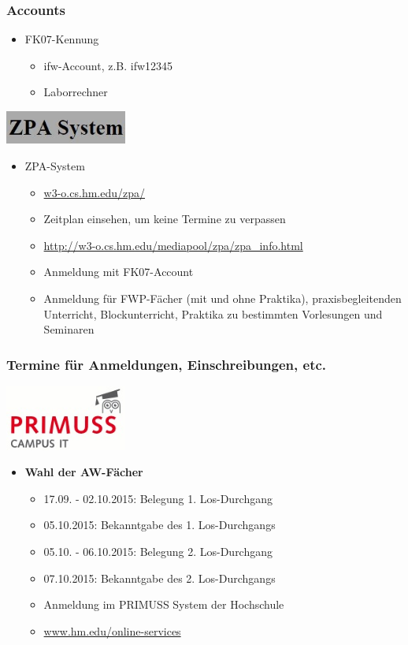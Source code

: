 \documentclass{beamer}
\begin{document}
    \begin{frame}[t]
    	\frametitle{Accounts}
    	\begin{itemize}
    		\item FK07-Kennung
    		\begin{itemize}
    			\item ifw-Account, z.B. ifw12345
    			\item Laborrechner
    		\end{itemize}
    	\end{itemize}
    	\pause
    	\flushright
    	\includegraphics[width=0.3\textwidth]{zpa.jpg}
    	\begin{itemize}
    		\item ZPA-System
    		\begin{itemize}
    			\item \url{w3-o.cs.hm.edu/zpa/}
    			\item Zeitplan einsehen, um keine Termine zu verpassen
    			\item \footnotesize{\url{http://w3-o.cs.hm.edu/mediapool/zpa/zpa_info.html}}
    			\item \normalsize{Anmeldung mit FK07-Account}$  $
    			\item Anmeldung für FWP-Fächer (mit und ohne Praktika),
    			praxisbegleitenden Unterricht,
    			Blockunterricht,
    			Praktika zu bestimmten Vorlesungen und
    			Seminaren
    		\end{itemize}
    	\end{itemize}
    \end{frame}
    
    \begin{frame}[t]
    	\frametitle{Termine für Anmeldungen, Einschreibungen, etc.}
    	\flushright
    	\includegraphics[width=0.3\textwidth]{primuss.jpg}
    	\begin{itemize}
    		\item \textbf{Wahl der AW-Fächer}
    		    \begin{itemize}
    		    	\item 17.09. - 02.10.2015: Belegung 1. Los-Durchgang
    		    	\item 05.10.2015: Bekanntgabe des 1. Los-Durchgangs
    		    	\item 05.10. - 06.10.2015: Belegung 2. Los-Durchgang
    		    	\item 07.10.2015: Bekanntgabe des 2. Los-Durchgangs
    		    	\bigskip
    		    	\item Anmeldung im PRIMUSS System der Hochschule
    		    	\item \url{www.hm.edu/online-services}
    		    \end{itemize}
    	\end{itemize}
    \end{frame}
    
\end{document}
